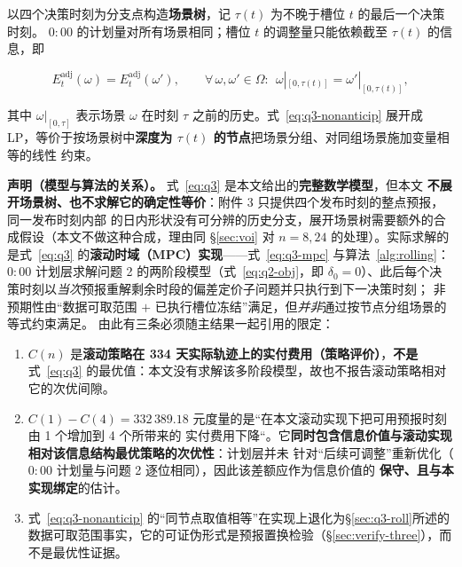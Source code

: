 以四个决策时刻为分支点构造\textbf{场景树}，记 \(\tau(t)\) 为不晚于槽位 \(t\) 的最后一个决策时刻。
\(0{:}00\) 的计划量对所有场景相同；槽位 \(t\) 的调整量只能依赖截至 \(\tau(t)\) 的信息，即

\begin{equation}
  E^{\text{adj}}_t(\omega)=E^{\text{adj}}_t(\omega'),
  \qquad
  \forall\,\omega,\omega'\in\Omega:\ \
  \omega|_{[0,\tau(t)]}=\omega'|_{[0,\tau(t)]},
  \label{eq:q3-nonanticip}
\end{equation}

其中 \(\omega|_{[0,\tau]}\) 表示场景 \(\omega\) 在时刻 \(\tau\) 之前的历史。式~\eqref{eq:q3-nonanticip}
展开成 LP，等价于按场景树中\textbf{深度为 \(\tau(t)\) 的节点}把场景分组、对同组场景施加变量相等的线性
约束。

\textbf{声明（模型与算法的关系）。} 式~\eqref{eq:q3} 是本文给出的\textbf{完整数学模型}，但本文
\textbf{不展开场景树、也不求解它的确定性等价}：附件 3 只提供四个发布时刻的整点预报，同一发布时刻内部
的日内形状没有可分辨的历史分支，展开场景树需要额外的合成假设（本文不做这种合成，理由同 \S\ref{sec:voi}
对 \(n=8,24\) 的处理）。实际求解的是式~\eqref{eq:q3} 的\textbf{滚动时域（MPC）实现}——式~\eqref{eq:q3-mpc}
与算法~\ref{alg:rolling}：\(0{:}00\) 计划层求解问题 2 的两阶段模型（式~\eqref{eq:q2-obj}，即
\(\delta_0=0\)）、此后每个决策时刻以\emph{当次}预报重解剩余时段的偏差定价子问题并只执行到下一决策时刻；
非预期性由“数据可取范围 \(+\) 已执行槽位冻结”满足，但\emph{并非}通过按节点分组场景的等式约束满足。
由此有三条必须随主结果一起引用的限定：

\begin{enumerate}[leftmargin=1.6em,itemsep=2pt,topsep=2pt]
  \item \(C(n)\) 是\textbf{滚动策略在 334 天实际轨迹上的实付费用（策略评价）}，\textbf{不是}式~\eqref{eq:q3}
        的最优值：本文没有求解该多阶段模型，故也不报告滚动策略相对它的次优间隙。
  \item \(C(1)-C(4)=332\,389.18\) 元度量的是“在本文滚动实现下把可用预报时刻由 1 个增加到 4 个所带来的
        实付费用下降“。它\textbf{同时包含信息价值与滚动实现相对该信息结构最优策略的次优性}：计划层并未
        针对“后续可调整”重新优化（\(0{:}00\) 计划量与问题 2 逐位相同），因此该差额应作为信息价值的
        \textbf{保守、且与本实现绑定}的估计。
  \item 式~\eqref{eq:q3-nonanticip} 的“同节点取值相等”在实现上退化为\S\ref{sec:q3-roll}所述的
        数据可取范围事实，它的可证伪形式是预报置换检验（\S\ref{sec:verify-three}），而不是最优性证据。
\end{enumerate}

